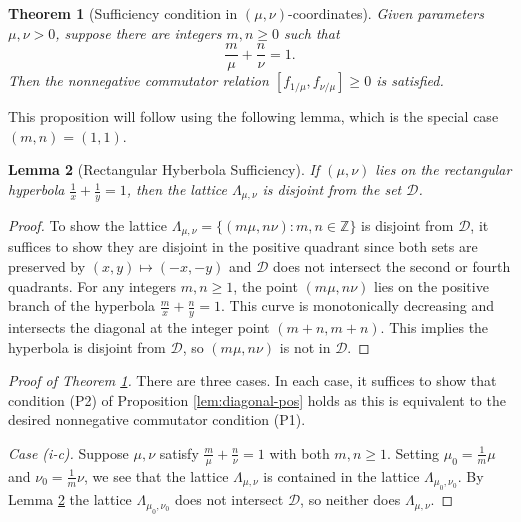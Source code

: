 \documentclass[11pt, letterpaper, reqno]{amsart}
\newtheorem{thm}{Theorem}[section]
\newtheorem{lem}[thm]{Lemma}
\theoremstyle{definition}
\numberwithin{equation}{section}
\newcommand{\ZZ}{\ensuremath{\mathbb{Z}}}
\newcommand{\um}{{\mu}}
\newcommand{\vm}{{\nu}}
\newcommand{\cD}{\mathcal{D}}
\begin{document}
{%
\begin{thm}[Sufficiency condition in $(\um, \vm)$-coordinates]
\label{thm:pos-sufficient}
Given parameters $\um, \vm>0$, 
suppose there are integers ${m,n\geq 0}$ such that
\begin{equation*}
\frac{m}{\um} + \frac{n}{\vm} = 1.
\end{equation*}
Then the nonnegative commutator relation $[f_{1/\um}, f_{\vm/\um}] \geq 0$ is satisfied.
\end{thm}

This  proposition will follow using  the following lemma, which is the special case $(m,n)=(1,1)$.
\begin{lem}[Rectangular Hyberbola Sufficiency]
\label{lem:hyperbola-pos}
If $(\um,\vm)$ lies on the rectangular hyperbola $\frac{1}{x} + \frac{1}{y} = 1$, then the lattice 
$\Lambda_{\um,\vm}$ is disjoint from the set $\mathcal{D}$.
\end{lem}

\begin{proof}
To show the lattice $\Lambda_{\um,\vm} = \{ (m\um, n\vm) : m,n \in\ZZ \}$ is disjoint from $\cD$,
it suffices to show they are disjoint in the positive quadrant since both sets are preserved by
  $(x,y) \mapsto (-x,-y)$ and $\cD$ does not intersect the second or fourth quadrants.
For any integers $m,n\geq 1$, the point $(m\um,n\vm)$ lies on the positive branch of the
 hyperbola $\frac{m}{x} + \frac{n}{y} = 1$. 
This curve is monotonically decreasing and intersects the diagonal at the integer point $(m+n, m+n)$.  
This implies the  hyperbola is disjoint from $\cD$, so
  $(m\um, n\vm)$ is not in $\cD$.
\end{proof}

\begin{proof}[Proof of  Theorem \ref{thm:pos-sufficient}]
There are three cases.
In each case, it suffices to show that condition (P2) of Proposition \ref{lem:diagonal-pos} 
holds as this is equivalent to the desired nonnegative commutator condition (P1).

{\em Case (i-c).}  Suppose $\um,\vm$ satisfy $\frac{m}{\um} + \frac{n}{\vm} = 1$ with both $m,n\geq 1$.
Setting $\um_0 = \frac{1}{m}\um$ and $\vm_0=\frac{1}{m}\vm$, 
we see that the lattice $\Lambda_{\um,\vm}$ is contained in the lattice $\Lambda_{\um_0, \vm_0}.$
By Lemma \ref{lem:hyperbola-pos} the lattice $\Lambda_{\um_0,\vm_0}$ does not intersect $\cD$, so neither does $\Lambda_{\um,\vm}$.


\end{proof}}
\end{document}
